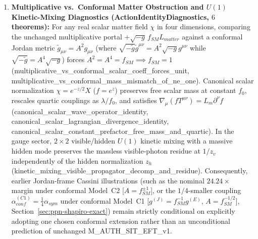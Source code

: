 \documentclass[american,11pt,letterpaper]{article}
\def\mathcal#1{#1}%
\def\mathrm#1{#1}%
\def\texttt#1{#1}%
\def\emph#1{#1}%
\begin{document}
\begin{enumerate}[leftmargin=2em]
  \item \textbf{Multiplicative vs.\ Conformal Matter Obstruction and $U(1)$ Kinetic-Mixing Diagnostics (\texttt{ActionIdentityDiagnostics}, $6$ theorems):} For any real scalar matter field $\chi$ in four dimensions, comparing the unchanged multiplicative portal $+\sqrt{-g}\,f_{\mathrm{SM}}\mathcal{L}_{\mathrm{matter}}$ against a conformal Jordan metric $\tilde{g}_{\mu\nu} = A^2 g_{\mu\nu}$ (where $\sqrt{-\tilde{g}}\tilde{g}^{\mu\nu} = A^2\sqrt{-g}g^{\mu\nu}$ while $\sqrt{-\tilde{g}} = A^4\sqrt{-g}$) forces $A^2 = A^4 = f_{\mathrm{SM}} \implies f_{\mathrm{SM}} = 1$ (\texttt{multiplicative\_\allowbreak{}vs\_\allowbreak{}conformal\_\allowbreak{}scalar\_\allowbreak{}coeff\_\allowbreak{}forces\_\allowbreak{}unit}, \texttt{multiplicative\_\allowbreak{}vs\_\allowbreak{}conformal\_\allowbreak{}mass\_\allowbreak{}mismatch\_\allowbreak{}of\_\allowbreak{}ne\_\allowbreak{}one}). Canonical scalar normalization $\chi = e^{-z/2}X$ ($f = e^z$) preserves free scalar mass at constant $f_0$, rescales quartic couplings as $\lambda/f_0$, and satisfies $\nabla_\mu(f T^{\mu\nu}) = \mathcal{L}_m \partial^\nu f$ (\texttt{canonical\_\allowbreak{}scalar\_\allowbreak{}wave\_\allowbreak{}operator\_\allowbreak{}identity}, \texttt{canonical\_\allowbreak{}scalar\_\allowbreak{}lagrangian\_\allowbreak{}divergence\_\allowbreak{}identity}, \texttt{canonical\_\allowbreak{}scalar\_\allowbreak{}constant\_\allowbreak{}prefactor\_\allowbreak{}free\_\allowbreak{}mass\_\allowbreak{}and\_\allowbreak{}quartic}). In the gauge sector, $2\times 2$ visible/hidden $U(1)$ kinetic mixing with a massive hidden mode preserves the massless visible-photon residue at $1/z_v$ independently of the hidden normalization $z_h$ (\texttt{kinetic\_\allowbreak{}mixing\_\allowbreak{}visible\_\allowbreak{}propagator\_\allowbreak{}decomp\_\allowbreak{}and\_\allowbreak{}residue}). Consequently, earlier Jordan-frame Cassini illustrations (such as the nominal $24.24\times$ margin under conformal Model~C2 [$A = f_{\mathrm{SM}}^{\pm 1}$], or the $1/4$-smaller coupling $\alpha_{\mathrm{conf}}^{(\mathrm{C1})} = \frac{1}{4}\alpha_{\mathrm{sym}}$ under conformal Model~C1 [$g^{(J)} = f_{\mathrm{SM}}^{-1}g^{(E)}$, $A = f_{\mathrm{SM}}^{-1/2}$], Section~\ref{sec:ppn-shapiro-exact}) remain strictly \emph{conditional} on explicitly adopting one chosen conformal extension rather than an unconditional prediction of unchanged \texttt{M\_AUTH\_SIT\_EFT\_v1}.

\end{enumerate}
\end{document}
